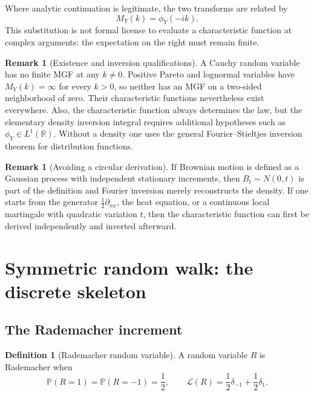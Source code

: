 \documentclass[10pt,a4paper]{article}
\numberwithin{equation}{section}
\theoremstyle{blueplain}
\theoremstyle{definition}
\newtheorem{definition}[theorem]{Definition}
\newtheorem{remark}[theorem]{Remark}
\newcommand{\Pp}{\mathbb P}
\newcommand{\R}{\mathbb R}
\begin{document}
Where analytic continuation is legitimate, the two transforms are related by
\begin{equation}
  M_Y(k)=\phi_Y(-ik).
  \label{eq:mgf-cf-relation}
\end{equation}
This substitution is not formal license to evaluate a characteristic function
at complex arguments: the expectation on the right must remain finite.

\begin{remark}[Existence and inversion qualifications]
A Cauchy random variable has no finite MGF at any \(k\ne0\).  Positive Pareto
and lognormal variables have \(M_Y(k)=\infty\) for every \(k>0\), so neither
has an MGF on a two-sided neighborhood of zero.  Their characteristic
functions nevertheless exist everywhere.  Also, the characteristic function
always determines the law, but the elementary density inversion integral
requires additional hypotheses such as \(\phi_Y\in L^1(\R)\).  Without a
density one uses the general Fourier--Stieltjes inversion theorem for
distribution functions.
\end{remark}

\begin{remark}[Avoiding a circular derivation]
If Brownian motion is defined as a Gaussian process with independent stationary
increments, then \(B_t\sim N(0,t)\) is part of the definition and Fourier
inversion merely reconstructs the density.  If one starts from the generator
\(\tfrac12\partial_{xx}\), the heat equation, or a continuous local martingale
with quadratic variation \(t\), then the characteristic function can first be
derived independently and inverted afterward.
\end{remark}

\section{Symmetric random walk: the discrete skeleton}

\subsection{The Rademacher increment}

\begin{definition}[Rademacher random variable]
A random variable \(R\) is Rademacher when
\begin{equation}
  \Pp(R=1)=\Pp(R=-1)=\frac12,
  \qquad
  \mathcal L(R)=\frac12\delta_{-1}+\frac12\delta_1.
  \label{eq:rademacher-law}
\end{equation}
\end{definition}
\end{document}
